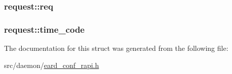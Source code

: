 \subsubsection[{\texorpdfstring{req}{req}}]{ request\+::req}\hypertarget{structrequest_a876777560756f3c5dd530a47168cae79}{}\label{structrequest_a876777560756f3c5dd530a47168cae79}
\subsubsection[{\texorpdfstring{time\+\_\+code}{time_code}}]{ request\+::time\+\_\+code}\hypertarget{structrequest_a44011d84573829de2aad5a0e201bbee0}{}\label{structrequest_a44011d84573829de2aad5a0e201bbee0}


The documentation for this struct was generated from the following file\+:\begin{DoxyCompactItemize}
\item 
src/daemon/\hyperlink{eard__conf__rapi_8h}{eard\+\_\+conf\+\_\+rapi.\+h}\end{DoxyCompactItemize}
